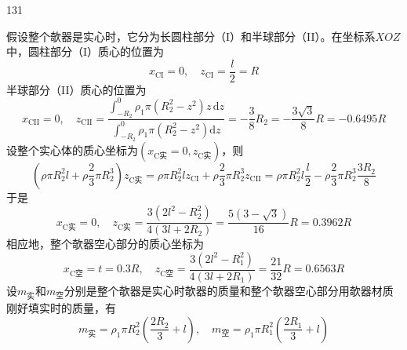 \begin{solution}{131}
    \begin{subsolution}
        假设整个欹器是实心时，它分为长圆柱部分（I）和半球部分（II）。在坐标系$XOZ$中，圆柱部分（I）质心的位置为
        \begin{equation}
            x _ {\mathrm{CI}} = 0, \quad z _ {\mathrm{CI}} = \frac {l}{2} = R
            \label{eq:1.s131}
        \end{equation}
        半球部分（II）质心的位置为
        \begin{equation}
            x _ {\mathrm{CII}} = 0, \quad z _ {\mathrm{CII}} = \frac {\int_ {- R _ {2}} ^ {0} \rho_ {1} \pi \left(R _ {2} ^ {2} - z ^ {2}\right) z \, \mathrm{d} z}{\int_ {- R _ {2}} ^ {0} \rho_ {1} \pi \left(R _ {2} ^ {2} - z ^ {2}\right) \mathrm{d} z} = - \frac {3}{8} R _ {2} = - \frac {3 \sqrt {3}}{8} R = - 0.6495 R
            \label{eq:2.s131}
        \end{equation}
        设整个实心体的质心坐标为$( x _ { \mathrm { C } \text {实} } = 0 , z _ { \mathrm { C } \text {实} } )$，则
        \begin{equation}
            \left(\rho \pi R _ {2} ^ {2} l + \rho \frac {2}{3} \pi R _ {2} ^ {3}\right) z _ {\mathrm{C} \text {实}} = \rho \pi R _ {2} ^ {2} l z _ {\mathrm{CI}} + \rho \frac {2}{3} \pi R _ {2} ^ {3} z _ {\mathrm{CII}} = \rho \pi R _ {2} ^ {2} l \frac {l}{2} - \rho \frac {2}{3} \pi R _ {2} ^ {3} \frac {3 R _ {2}}{8}
            \label{eq:3.s131}
        \end{equation}
        于是
        \begin{equation}
            x _ {\mathrm{C} \text {实}} = 0, \quad z _ {\mathrm{C} \text {实}} = \frac {3 (2 l ^ {2} - R _ {2} ^ {2})}{4 (3 l + 2 R _ {2})} = \frac {5 (3 - \sqrt {3})}{16} R = 0.3962 R
            \label{eq:4.s131}
        \end{equation}
        相应地，整个欹器空心部分的质心坐标为
        \begin{equation}
            x _ {\mathrm{C空}} = t = 0.3 R, \quad z _ {\mathrm{C空}} = \frac {3 \left(2 l ^ {2} - R _ {1} ^ {2}\right)}{4 \left(3 l + 2 R _ {1}\right)} = \frac {21}{32} R = 0.6563 R
            \label{eq:5.s131}
        \end{equation}
        设$m _ { \text {实} }$和$m _ { \text {空} }$分别是整个欹器是实心时欹器的质量和整个欹器空心部分用欹器材质刚好填实时的质量，有
        \begin{equation}
            m _ {\text {实}} = \rho_ {1} \pi R _ {2} ^ {2} \left(\frac {2 R _ {2}}{3} + l\right), \quad m _ {\text {空}} = \rho_ {1} \pi R _ {1} ^ {2} \left(\frac {2 R _ {1}}{3} + l\right)

\end{equation}
\end{subsolution}
\end{solution}

